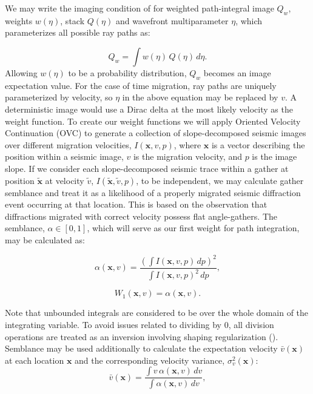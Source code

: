 We may write the imaging condition of \cite{landa2006} for weighted path-integral image $Q_w$, weights $w \left( \eta \right)$, stack $Q\left( \eta \right)$ and wavefront multiparameter $\eta$, which parameterizes all  possible ray paths as:

\begin{equation}
\label{eq:landaimaging}
Q_w = \int w \left( \eta \right) \, Q \left( \eta \right) \, d \eta .
\end{equation}
Allowing $w \left( \eta \right)$ to be a probability distribution, $Q_w$ becomes an image expectation value. For the case of time migration, ray paths are uniquely parameterized by velocity, so $\eta$ in the above equation may be replaced by $v$. A deterministic image would use a Dirac delta at the most likely velocity as the weight function. To create our weight functions we will apply Oriented Velocity Continuation (OVC) to generate a collection of slope-decomposed seismic images over different migration velocities, $I(\mathbf{x},v,p)$, where $\mathbf{x}$ is a vector describing the position within a seismic image, $v$ is the migration velocity, and $p$ is the image slope. 
If we consider each slope-decomposed seismic trace within a gather at position $\mathbf{\tilde{x}}$ at velocity $\tilde{v}$, $I(\mathbf{\tilde{x}},\tilde{v},p)$, to be independent, we may calculate gather semblance and treat it as a likelihood of a properly migrated seismic diffraction event occurring at that location. This is based on the observation that diffractions migrated with correct velocity possess flat angle-gathers. The semblance, $\alpha \in \left[ 0,1 \right]$, which will serve as our first weight for path integration, may be calculated as:

\begin{equation}
\label{eq:semblance}
\alpha(\mathbf{x},v) = \frac{\left(\int I(\mathbf{x},v,p) \, dp \right)^2}{\int I(\mathbf{x},v,{p})^2 \, dp} ,
\end{equation}

\begin{equation}
\label{eq:wt1}
W_1(\mathbf{x},v) = \alpha(\mathbf{x},v).
\end{equation}

Note that unbounded integrals are considered to be over the whole domain of the integrating variable.  To avoid issues related to dividing by $0$, all division operations are treated as an inversion involving shaping regularization (\citealp{attr}).
Semblance may be used additionally to calculate the expectation velocity $\bar{v}(\mathbf{x})$ at each location $\mathbf{x}$ and the corresponding velocity variance, $\sigma^2_v(\mathbf{x})$:
\begin{equation}
\label{eq:velocity}
\bar{v}(\mathbf{x}) = \frac { \int v \, \alpha(\mathbf{x},v) \, dv }{ \int \alpha(\mathbf{x},v) \, dv },
\end{equation}

